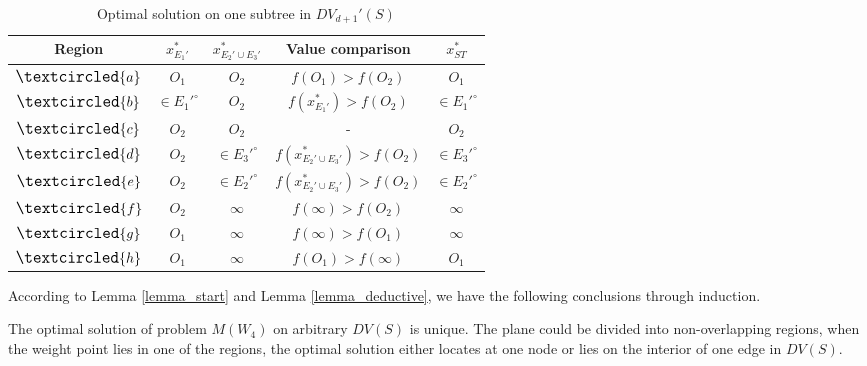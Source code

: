 \documentclass[final,3p,times]{elsarticle}
\begin{document}
\begin{table}
  \caption{Optimal solution on one subtree in $DV_{d+1}'(S)$}
  \label{table_subtree}
  \small
  \renewcommand{\arraystretch}{1.5}
  \centering
  \begin{tabular}{|*{5}{c|}}
  \hline
  Region  &  $x^*_{E_1'}$ &   $x^*_{E_2'\cup E_3'}$ & Value comparison  &  $x^*_{ST}$           \\ \hline
  $\large{\textcircled{\small{a}}}$   & $O_1$         & $O_2$             & $f(O_1)>f(O_2)$   & $O_1$                  \\ \hline
  $\large{\textcircled{\small{b}}}$   & $\in E_1'^\circ$     & $O_2$             & $f(x^*_{E_1'})>f(O_2)$   & $\in E_1'^\circ$           \\ \hline
  $\large{\textcircled{\small{c}}}$   & $O_2$         & $O_2$             & -                 & $O_2$                 \\ \hline
  $\large{\textcircled{\small{d}}}$   & $O_2$         & $\in E_3'^\circ$   & $f(x^*_{E_2'\cup E_3'})>f(O_2)$   & $\in E_3'^\circ$      \\ \hline
  $\large{\textcircled{\small{e}}}$   & $O_2$         & $\in E_2'^\circ$   & $f(x^*_{E_2'\cup E_3'})>f(O_2)$   & $\in E_2'^\circ$       \\ \hline
  $\large{\textcircled{\small{f}}}$   & $O_2$         & $\infty$          & $f(\infty)>f(O_2)$& $\infty$                \\ \hline
  $\large{\textcircled{\small{g}}}$   & $O_1$         & $\infty$          & $f(\infty)>f(O_1)$& $\infty$               \\ \hline
  $\large{\textcircled{\small{h}}}$   & $O_1$         & $\infty$          & $f(O_1)>f(\infty)$& $O_1$                   \\ \hline
  \end{tabular}
\end{table}

According to Lemma \ref{lemma_start} and Lemma \ref{lemma_deductive}, we have the following conclusions through induction.
\begin{Theorem}
\label{theorem_arbitrary_case}
The optimal solution of problem $M(W_4)$ on arbitrary $DV(S)$ is unique. The plane could be divided into non-overlapping regions, when the weight point lies in one of the regions, the optimal solution either locates at one node or lies on the interior of one edge in $DV(S)$.
\end{Theorem}
\end{document}
